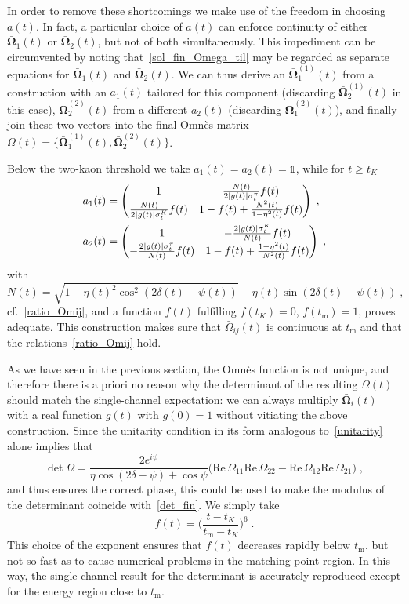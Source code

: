 \documentclass[11pt]{article}%
\providecommand{\ec}{\;,}
\providecommand{\ep}{\;.}
\providecommand{\nt}{\notag}
\newcommand{\tK}{t_K}
\newcommand{\tm}{t_\text{m}}
\newcommand{\beq}{\begin{equation}}
\newcommand{\eeq}{\end{equation}}
\renewcommand{\Re}{\text{Re}\,}
\begin{document}
In order to remove these shortcomings we make use of the freedom in choosing $a(t)$. In fact, a particular choice of $a(t)$ can  enforce continuity of either $\bar{\mathbf{\Omega}}_1(t)$ or $\bar{\mathbf{\Omega}}_2(t)$, but not of both simultaneously. This impediment can be circumvented by noting that~\eqref{sol_fin_Omega_til} may be regarded as separate equations for $\bar{\mathbf{\Omega}}_1(t)$ and $\bar{\mathbf{\Omega}}_2(t)$. We can thus derive an $\bar{\mathbf{\Omega}}_1^{(1)}(t)$ from a construction with an $a_1(t)$ tailored for this component (discarding $\bar{\mathbf{\Omega}}_2^{(1)}(t)$ in this case), $\bar{\mathbf{\Omega}}_2^{(2)}(t)$ from a different $a_2(t)$ (discarding $\bar{\mathbf{\Omega}}_1^{(2)}(t)$), and finally join these two vectors into the final Omn\`es matrix $\Omega(t)=\big\{\bar{\mathbf{\Omega}}_1^{(1)}(t),\bar{\mathbf{\Omega}}_2^{(2)}(t)\big\}$. 

Below the two-kaon threshold we take $a_1(t)=a_2(t)=\mathds{1}$, while for $t\geq \tK$
\begin{align}
a_1(t)&=\begin{pmatrix}
        1 & \frac{N(t)}{2|g(t)|\sigma_t^\pi}f(t)\\
\frac{N(t)}{2|g(t)|\sigma_t^K}f(t) & 1-f(t)+\frac{N^2(t)}{1-\eta^2(t)}f(t)
       \end{pmatrix}\ec\nt\\
a_2(t)&=\begin{pmatrix}
        1 & -\frac{2|g(t)|\sigma_t^K}{N(t)}f(t)\\
-\frac{2|g(t)|\sigma_t^\pi}{N(t)}f(t) & 1-f(t)+\frac{1-\eta^2(t)}{N^2(t)}f(t)
       \end{pmatrix}\ec
\end{align}
with
\beq
N(t)=\sqrt{1-\eta(t)^2\cos^2(2\delta(t)-\psi(t))}-\eta(t)\sin(2\delta(t)-\psi(t))\ec
\eeq
cf.~\eqref{ratio_Omij}, and a function $f(t)$ fulfilling $f(\tK)=0$, $f(\tm)=1$, proves adequate. This construction makes sure that $\bar \Omega_{ij}(t)$ is continuous at $\tm$ and that the relations~\eqref{ratio_Omij} hold. 

As we have seen in the previous section, the Omn\`es function is not unique, and therefore there is a priori no reason why the determinant of the resulting $\Omega(t)$ should match the single-channel expectation: we can always multiply $\bar{\mathbf{\Omega}}_i(t)$ with a real function $g(t)$ with $g(0)=1$ without vitiating the above construction. Since the unitarity condition in its form analogous to~\eqref{unitarity} alone implies that
\beq
\det\Omega=\frac{2e^{i\psi}}{\eta\cos(2\delta-\psi)+\cos\psi}\big(\Re\Omega_{11}\Re\Omega_{22}-\Re\Omega_{12}\Re\Omega_{21}\big)\ec
\eeq
and thus ensures the correct phase, this could be used to make the modulus of the determinant coincide with~\eqref{det_fin}. We simply take
\beq
\label{fOmnes}
f(t)=\bigg(\frac{t-\tK}{\tm-\tK}\bigg)^6\ep
\eeq
This choice of the exponent ensures that $f(t)$ decreases rapidly below $\tm$, but not so fast as to cause numerical problems in the matching-point region. In this way, the single-channel result for the determinant is accurately reproduced except for the energy region close to $\tm$.
\end{document}
